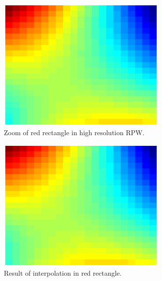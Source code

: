 \documentclass{article}
\begin{document}
\begin{figure}[h]
  \begin{center}
    \includegraphics[width=0.75\textwidth]{figures/interpolation/high_res_trouble_spot_12_7.eps}
    \caption{Zoom of red rectangle in high resolution RPW.}
  \end{center}
\end{figure}

\begin{figure}[h]
  \begin{center}
    \includegraphics[width=0.75\textwidth]{figures/interpolation/interpolated_trouble_spot_12_7.eps}
    \caption{Result of interpolation in red rectangle.}
  \end{center}
\end{figure}
\end{document}

